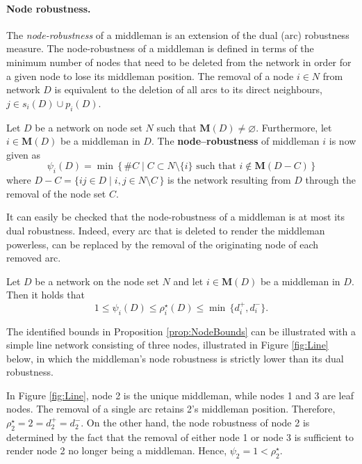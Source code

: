 \paragraph{Node robustness.}

The \emph{node-robustness} of a middleman is an extension of the dual (arc) robustness measure. The node-robustness of a middleman is defined in terms of the minimum number of nodes that need to be deleted from the network in order for a given node to lose its middleman position. The removal of a node $i \in N$ from network $D$ is equivalent to the deletion of all arcs to its direct neighbours, $j \in s_i (D) \cup p_i(D)$.

\begin{definition}
Let $D$ be a network on node set $N$ such that $\mathbf{M}(D) \neq \varnothing$. Furthermore, let $i \in  \mathbf{M}(D)$ be a middleman in $D$. The \textbf{node--robustness} of middleman $i$ is now given as
\begin{equation}
\psi_{i} (D) = \min \, \{ \, \# C \mid C \subset N \setminus \{ i \} \mbox{ such that } i \notin \mathbf{M}(D-C) \, \}
\end{equation}
where $D-C = \{ ij \in D \mid i,j \in N \setminus C \, \}$ is the network resulting from $D$ through the removal of the node set $C$.
\end{definition}

\noindent
It can easily be checked that the node-robustness of a middleman is at most its dual robustness. Indeed, every arc that is deleted to render the middleman powerless, can be replaced by the removal of the originating node of each removed arc.
\begin{proposition} \label{prop:NodeBounds}
	Let $D$ be a network on the node set $N$ and let $i \in \mathbf M (D)$ be a middleman in $D$. Then it holds that
	\begin{equation}
		1 \leqslant \psi_i (D) \leqslant \rho^{\star}_i (D) \leqslant \min \, \{ d^+_i , d^-_i \} .
	\end{equation}
\end{proposition}

\noindent
The identified bounds in Proposition \ref{prop:NodeBounds} can be illustrated with a simple line network consisting of three nodes, illustrated in Figure \ref{fig:Line} below, in which the middleman's node robustness is strictly lower than its dual robustness.

In Figure \ref{fig:Line}, node 2 is the unique middleman, while nodes 1 and 3 are leaf nodes. The removal of a single arc retains 2's middleman position. Therefore, $\rho^{\star}_2 =2 = d^+_2=d^-_2$. On the other hand, the node robustness of node 2 is determined by the fact that the removal of either node 1 or node 3 is sufficient to render node 2 no longer being a middleman. Hence, $\psi_2 = 1 < \rho^{\star}_2$.

